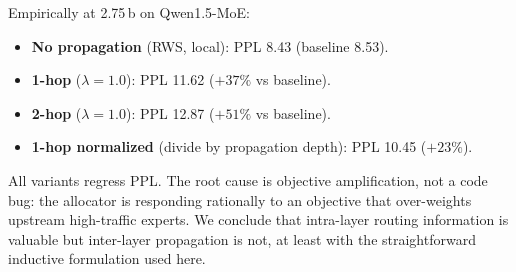 \documentclass{article}
\newcommand{\method}{\textsc{RWS}\xspace}
\begin{document}
Empirically at 2.75\,b on Qwen1.5-MoE:
\begin{itemize}
\item \textbf{No propagation} (\method, local): PPL 8.43 (baseline 8.53).
\item \textbf{1-hop} ($\lambda=1.0$): PPL 11.62 ($+37\%$ vs baseline).
\item \textbf{2-hop} ($\lambda=1.0$): PPL 12.87 ($+51\%$ vs baseline).
\item \textbf{1-hop normalized} (divide by propagation depth): PPL 10.45 ($+23\%$).
\end{itemize}

All variants regress PPL. The root cause is objective amplification, not a code bug: the allocator is responding rationally to an objective that over-weights upstream high-traffic experts. We conclude that intra-layer routing information is valuable but inter-layer propagation is not, at least with the straightforward inductive formulation used here.
\end{document}

